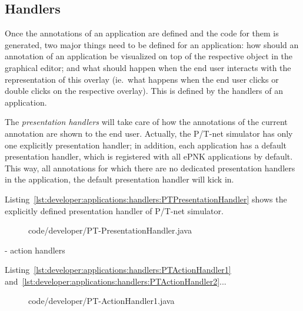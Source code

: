 
\subsection{Handlers}
\label{subsec:developer:applications:handlers}

Once the annotations of an application are defined and the code
for them is generated, two major things need to be defined for an application:
how should an annotation of an application be visualized on top of
the respective object in the graphical editor; and what should happen
when the end user interacts with the representation of this overlay (ie.\,
what happens when the end user clicks or double clicks on the respective overlay). This
is defined by the handlers of an application.

The \emph{presentation handlers} will take care of how the annotations of
the current annotation are shown to the end user. Actually, the
P/T-net simulator has only one explicitly presentation handler; in addition,
each application has a default presentation handler, which is registered with
all ePNK applications by default. This way, all annotations for which there
are no dedicated presentation handlers in the application, the default
presentation handler will kick in.

Listing~\ref{lst:developer:applications:handlers:PTPresentationHandler} shows the
explicitly defined presentation handler of P/T-net simulator.


\begin{figure}[htbp!]
%
  {code/developer/PT-PresentationHandler.java}
\end{figure}


- action handlers

Listing~\ref{lst:developer:applications:handlers:PTActionHandler1}
and~\ref{lst:developer:applications:handlers:PTActionHandler2}...

\begin{figure}[htbp!]
%
  {code/developer/PT-ActionHandler1.java}
\end{figure}

